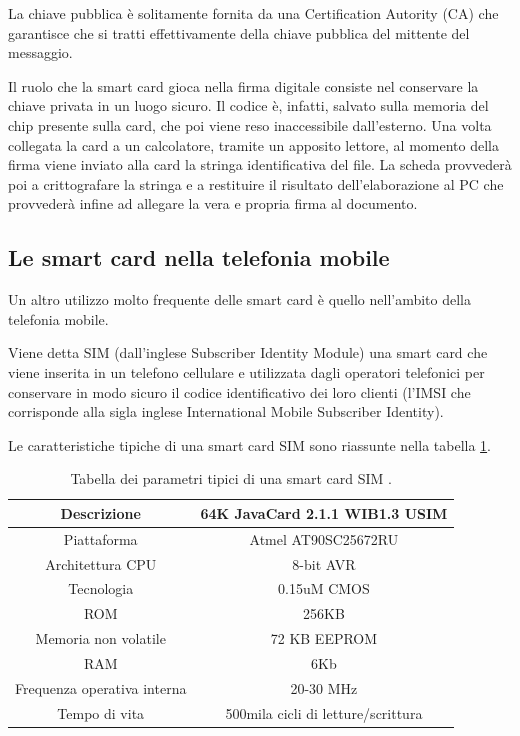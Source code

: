 La chiave pubblica è solitamente fornita da una Certification Autority (CA) che garantisce che si tratti effettivamente della chiave pubblica del mittente del messaggio.

Il ruolo che la smart card gioca nella firma digitale consiste nel conservare la chiave privata in un luogo sicuro. Il codice è, infatti, salvato sulla memoria del chip presente sulla card, che poi viene reso inaccessibile dall'esterno. Una volta collegata la card a un calcolatore, tramite un apposito lettore, al momento della firma viene inviato alla card la stringa identificativa del file. La scheda provvederà poi a crittografare la stringa e a restituire il risultato dell'elaborazione al PC che provvederà infine ad allegare la vera e propria firma al documento.
\cite{Wiki_fd}

\subsection{Le smart card nella telefonia mobile}
\label{applet_sim}
Un altro utilizzo molto frequente delle smart card è quello nell'ambito della telefonia mobile.

Viene detta SIM (dall'inglese Subscriber Identity Module) una smart card che viene inserita in un telefono cellulare e utilizzata dagli operatori telefonici per conservare in modo sicuro il codice identificativo dei loro clienti (l'IMSI che corrisponde alla sigla inglese International Mobile Subscriber Identity).

Le caratteristiche tipiche di una smart card SIM sono riassunte nella tabella \ref{parametri_SIM}.

\begin{table}[h!]
\centering
\begin{tabular}{ |c|c| } 
 \hline
 Descrizione &  64K JavaCard 2.1.1 WIB1.3 USIM \\
 \hline
 Piattaforma & Atmel AT90SC25672RU \\ 
 \hline
 Architettura CPU & 8-bit AVR \\ 
 \hline
 Tecnologia & 0.15uM CMOS \\ 
 \hline
 ROM & 256KB \\
 \hline
 Memoria non volatile & 72 KB EEPROM \\
 \hline
 RAM & 6Kb \\
 \hline
 Frequenza operativa interna & 20-30 MHz \\
 \hline
 Tempo di vita & 500mila cicli di letture/scrittura \\
 \hline
 
\end{tabular}
\caption{Tabella dei parametri tipici di una smart card SIM \cite{secret_life}.}
\label{parametri_SIM}
\end{table}

